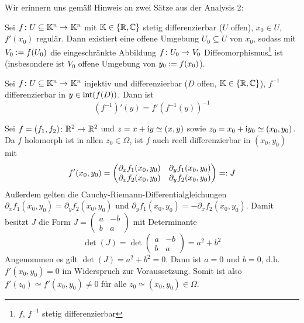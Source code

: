 \begin{exercisePage}
	Wir erinnern uns gemäß Hinweis an zwei Sätze aus der Analysis 2:
	
	\begin{lemma} \label{2lemma: invFkt}
		Sei $\abb{f}{U \subseteq \K^n}{\K^n}$ mit $\mathbb{K} \in \left\{ \mathbb{R}, \mathbb{C} \right\}$ stetig differenzierbar ($U$ offen), $x_0 \in U$, $f'(x_0)$ regulär. Dann existiert eine offene Umgebung $U_0 \subseteq U$ von $x_0$, sodass mit $V_0 \mathrel{:=} f(U_0)$ die eingeschränkte Abbildung $\abb{f}{U_0}{V_0}$ Diffeomorphismus\footnote{$f$, $f^{-1}$ stetig differenzierbar} ist (insbesondere ist $V_0$ offene Umgebung von $y_0 \mathrel{:=} f(x_0)$).
	\end{lemma}
	\begin{lemma} \label{2lemma: AbleitunginvFkt}
		Sei $\abb{f}{U \subseteq \K^n}{\K^n}$ injektiv und differenzierbar ($D$ offen, $\mathbb{K} \in \left\{ \mathbb{R}, \mathbb{C} \right\}$), $f^{-1}$ differenzierbar in $y \in \operatorname{int}(f(D))$. Dann ist
		\begin{equation*}
			(f^{-1})'(y) = f'(f^{-1}(y))^{-1}
		\end{equation*}
	\end{lemma}

	Sei $\abb{f = (f_1, f_2)}{\R^2}{\R^2}$ und $z = x + \mathrm{i} y \simeq (x,y)$ sowie $z_0 = x_0 + \mathrm{i}  y_0 \simeq (x_0,y_0)$. Da $f$ holomorph ist in allen $z_0 \in \Omega$, ist $f$ auch reell differenzierbar in $(x_0, y_0)$ mit 
	\begin{equation*}
		f'(x_0, y_0) = \begin{pmatrix}
			\partial_x f_1(x_0, y_0) & \partial_y f_1(x_0, y_0) \\
			\partial_x f_2(x_0, y_0) & \partial_y f_2(x_0, y_0)
		\end{pmatrix} 
		\mathrel{=:} J
	\end{equation*}
	Außerdem gelten die Cauchy-Riemann-Differentialgleichungen $\partial_x f_1(x_0, y_0) = \partial_y f_2(x_0, y_0)$ und $\partial_y f_1(x_0, y_0) = - \partial_x f_2(x_0, y_0)$. Damit besitzt $J$ die Form $J = \left( \begin{smallmatrix} a & -b \\ b & a \end{smallmatrix} \right)$ mit Determinante
	\begin{equation*}
		\det(J) = \det\begin{pmatrix} a & -b \\ b & a \end{pmatrix} = a^2 + b^2
	\end{equation*}
	Angenommen es gilt $\det(J) = a^2 + b^2 = 0$. Dann ist $a=0$ und $b=0$, d.h. $f'(x_0, y_0) = 0$ im Widerspruch zur Voraussetzung. Somit ist also $f'(z_0) \simeq f'(x_0,y_0) \neq 0$ für alle $z_0 \simeq (x_0, y_0) \in \Omega$.
	

\end{exercisePage}
